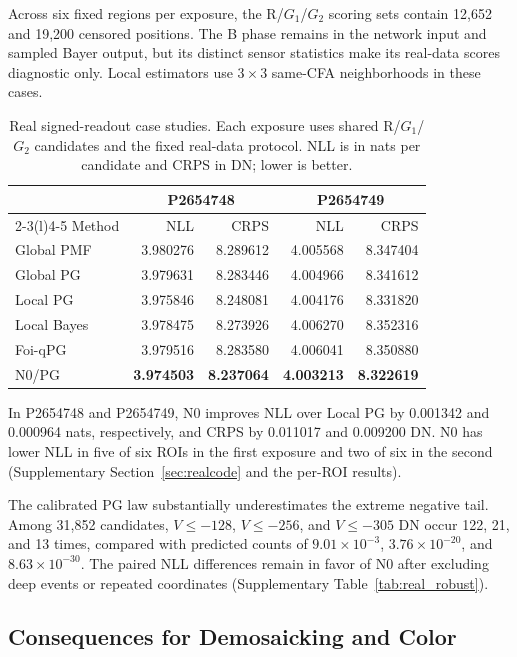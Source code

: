 \documentclass[10pt,twocolumn,journal]{IEEEtran}
\begin{document}
Across six fixed regions per exposure, the R/$G_1$/$G_2$ scoring sets contain 12,652 and 19,200 censored positions. The B phase remains in the network input and sampled Bayer output, but its distinct sensor statistics make its real-data scores diagnostic only. Local estimators use $3\times3$ same-CFA neighborhoods in these cases.

\begin{table}[t]
\centering
\caption{Real signed-readout case studies. Each exposure uses shared R/$G_1$/$G_2$ candidates and the fixed real-data protocol. NLL is in nats per candidate and CRPS in DN; lower is better.}
\label{tab:real}
\footnotesize
\begin{tabular}{@{}lrrrr@{}}
\toprule
& \multicolumn{2}{c}{P2654748} & \multicolumn{2}{c}{P2654749}\\
\cmidrule(lr){2-3}\cmidrule(l){4-5}
Method & NLL & CRPS & NLL & CRPS\\
\midrule
Global PMF & 3.980276 & 8.289612 & 4.005568 & 8.347404\\
Global PG & 3.979631 & 8.283446 & 4.004966 & 8.341612\\
Local PG & 3.975846 & 8.248081 & 4.004176 & 8.331820\\
Local Bayes & 3.978475 & 8.273926 & 4.006270 & 8.352316\\
Foi-qPG & 3.979516 & 8.283580 & 4.006041 & 8.350880\\
N0/PG & \textbf{3.974503} & \textbf{8.237064} & \textbf{4.003213} & \textbf{8.322619}\\
\bottomrule
\end{tabular}
\end{table}

In P2654748 and P2654749, N0 improves NLL over Local PG by 0.001342 and 0.000964 nats, respectively, and CRPS by 0.011017 and 0.009200 DN. N0 has lower NLL in five of six ROIs in the first exposure and two of six in the second (Supplementary Section~\ref{sec:realcode} and the per-ROI results).

The calibrated PG law substantially underestimates the extreme negative tail. Among 31,852 candidates, $V\leq-128$, $V\leq-256$, and $V\leq-305$ DN occur 122, 21, and 13 times, compared with predicted counts of $9.01\times10^{-3}$, $3.76\times10^{-20}$, and $8.63\times10^{-30}$. The paired NLL differences remain in favor of N0 after excluding deep events or repeated coordinates (Supplementary Table~\ref{tab:real_robust}).



\subsection{Consequences for Demosaicking and Color}\label{sec:downstream}
\end{document}
